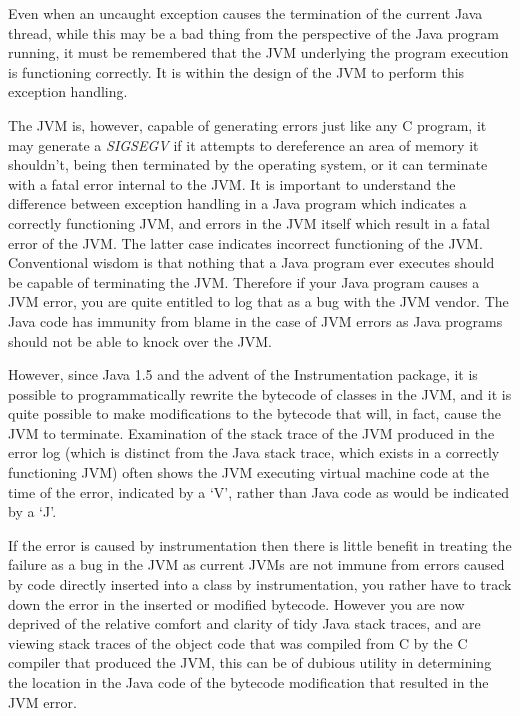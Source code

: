 \documentclass[]{final_report}
\begin{document}
Even when an uncaught exception causes the termination of the current Java thread, while this may be a bad thing from the perspective of the Java program running, it must be remembered that the JVM underlying the program execution is functioning correctly. It is within the design of the JVM to perform this exception handling.

The JVM is, however, capable of generating errors just like any C program, it may generate a \textit{SIGSEGV} if it attempts to dereference an area of memory it shouldn't, being then terminated by the operating system, or it can terminate with a fatal error internal to the JVM. It is important to understand the difference between exception handling in a Java program which indicates a correctly functioning JVM, and errors in the JVM itself which result in a fatal error of the JVM. The latter case indicates incorrect functioning of the JVM. Conventional wisdom is that nothing that a Java program ever executes should be capable of terminating the JVM. Therefore if your Java program causes a JVM error, you are quite entitled to log that as a bug with the JVM vendor. The Java code has immunity from blame in the case of JVM errors as Java programs should not be able to knock over the JVM.

However, since Java 1.5 and the advent of the Instrumentation package, it is possible to programmatically rewrite the bytecode of classes in the JVM, and it is quite possible to make modifications to the bytecode that will, in fact, cause the JVM to terminate. Examination of the stack trace of the JVM produced in the error log (which is distinct from the Java stack trace, which exists in a correctly functioning JVM) often shows the JVM executing virtual machine code at the time of the error, indicated by a `V', rather than Java code as would be indicated by a `J'.

If the error is caused by instrumentation then there is little benefit in treating the failure as a bug in the JVM as current JVMs are not immune from errors caused by code directly inserted into a class by instrumentation, you rather have to track down the error in the inserted or modified bytecode. However you are now deprived of the relative comfort and clarity of tidy Java stack traces, and are viewing stack traces of the object code that was compiled from C by the C compiler that produced the JVM, this can be of dubious utility in determining the location in the Java code of the bytecode modification that resulted in the JVM error.
\end{document}
